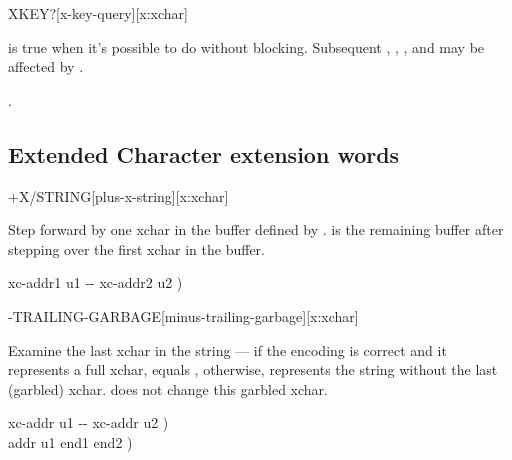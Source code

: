 \begin{worddef*}[XKEYq]{}{XKEY?}[x-key-query][x:xchar]
\item {}

	 is true when it's possible to do  without
	blocking.  Subsequent , ,
	, and  may be affected
	by .

\see {}.
\end{worddef*}


\subsection{Extended Character extension words} %
\extended

\begin{worddef*}{}{+X/STRING}[plus-x-string][x:xchar]
\item {}

	Step forward by one xchar in the buffer defined by .
	 is the remaining buffer after stepping over the
	first xchar in the buffer.

	\begin{implement}
	\word{:}   xc-addr1 u1 -{}- xc-addr2 u2 ) \\
	\tab {}    \word{-}  \word{;}
	\end{implement}
\end{worddef*}


\begin{worddef*}{}{-TRAILING-GARBAGE}[minus-trailing-garbage][x:xchar]
\item {}

	Examine the last xchar in the string  --- if the
	encoding is correct and it represents a full xchar,  equals
	, otherwise,  represents the string without the
	last (garbled) xchar.   does not change this
	garbled xchar.

	\begin{implement}
	\word{:}   xc-addr u1 -{}- xc-addr u2 ) \\
	\tab {} \word{+}    addr u1 end1 end2 ) \\
	\tab {}    \word{-}  \word{+} \word{=}    \\
	\tab[2]  \\
	\tab {} \\
	\tab[2]    \word{-} \\
	\tab {} \word{;}
	\end{implement}
\end{worddef*}


